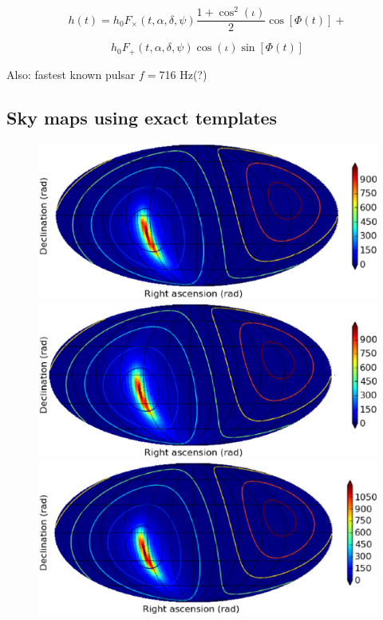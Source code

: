 \[
h(t)=h_{0}F_{\times}(t,\alpha,\delta,\psi)\frac{1+\cos^{2}(\iota)}{2}\cos[\Phi(t)]+
\]



\[
h_{0}F_{+}(t,\alpha,\delta,\psi)\cos(\iota)\sin[\Phi(t)]
\]



Also: fastest known pulsar $f=$716 Hz(?)


\subsection{Sky maps using exact templates}


\begin{figure}
\begin{center}
\includegraphics[width=0.6\paperwidth,height=0.2\paperheight]{maptrueH1.eps}
\includegraphics[width=0.6\paperwidth,height=0.2\paperheight]{maptrueL1.eps}
\includegraphics[width=0.6\paperwidth,height=0.2\paperheight]{maptrueV1.eps}

\end{center}
\end{figure}
